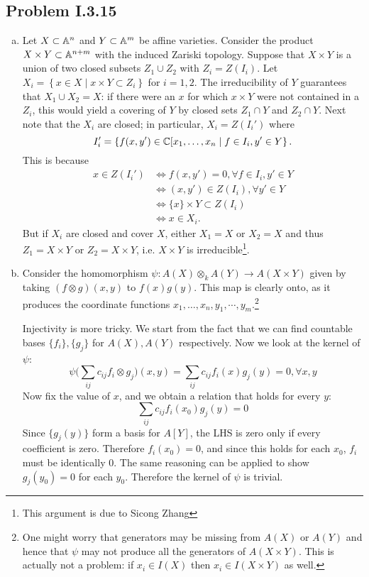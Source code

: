 \documentclass{mathnotes}
\begin{document}
\subsection*{Problem I.3.15}
\begin{enumerate}[(a)]
    \item Let $X\subset\mathbb{A}^n$ and $Y\subset\mathbb{A}^m$ be affine varieties. Consider the product
        $X\times Y\subset\mathbb{A}^{n+m}$ with the induced Zariski topology. Suppose that $X\times Y$
        is a union of two closed subsets $Z_1\cup Z_2$ with $Z_i=Z(I_i)$.
        Let $X_i=\left\{ x\in X\mid x\times Y\subset Z_i \right\}$
        for $i=1,2$. The irreducibility of $Y$ guarantees that $X_1\cup X_2=X$: if there were
        an $x$ for which $x\times Y$ were not contained in a $Z_i$, this would yield a
        covering of $Y$ by closed sets $Z_1\cap Y$ and $Z_2\cap Y$.
        Next note that the $X_i$ are closed; in particular, $X_i=Z(I_i')$ where
        \[I_i'=\left\{ f(x,y')\in\mathbb{C}[x_1,\ldots,x_n\mid f\in I_i, y'\in Y \right\}.\]
        This is because
        \begin{align*}
            x\in Z(I_i')&\iff f(x,y')=0, \forall f\in I_i, y'\in Y\\
            &\iff (x,y')\in Z(I_i), \forall y'\in Y\\
            &\iff \{x\}\times Y\subset Z(I_i)\\
            &\iff x\in X_i.
        \end{align*}
        But if $X_i$ are closed and cover $X$, either $X_1=X$ or $X_2=X$
        and thus $Z_1=X\times Y$ or $Z_2=X\times Y$, i.e. $X\times Y$ is irreducible\footnote{This argument is due to Sicong Zhang}.
    \item Consider the homomorphism $\psi:A(X)\otimes_kA(Y)\to A(X\times Y)$ given by taking $(f\otimes g)(x,y)$
        to $f(x)g(y)$. This map is clearly onto, as it produces the coordinate functions
        $x_1,\ldots,x_n,y_1,\cdots,y_m$.\footnote{One might worry that generators may be missing from
        $A(X)$ or $A(Y)$ and hence that $\psi$ may not produce all the generators of $A(X\times Y)$.
        This is actually not a problem: if $x_i\in I(X)$ then $x_i\in I(X\times Y)$ as well.}

        Injectivity is more tricky. We start from the fact that we can find countable bases $\{f_i\}, \{g_j\}$ for $A(X), A(Y)$ respectively. Now we look at the kernel of $\psi$:
\[      \psi\big(\sum_{ij} c_{ij} f_i \otimes g_j \big) (x,y) = \sum_{ij} c_{ij} f_i(x) g_j(y) = 0, \forall x,y     \]
Now fix the value of $x$, and we obtain a relation that holds for every $y$:
\[       \sum_{ij} c_{ij} f_i(x_0) g_j(y) = 0     \]
Since $\{g_j(y)\}$ form a basis for $A[Y]$, the LHS is zero only if every coefficient is zero. Therefore $f_i(x_0) = 0$, and since this holds for each $x_0$, $f_i$ must be identically $0$. The same reasoning can be applied to show $g_j(y_0) = 0$ for each $y_0$. Therefore the kernel of $\psi$ is trivial.


\end{enumerate}
\end{document}
